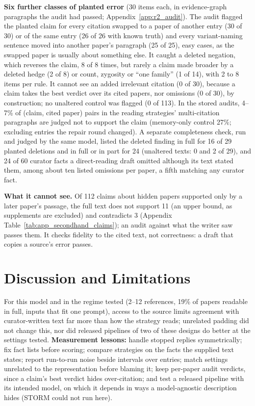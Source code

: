 \documentclass{article} %
\begin{document}
\textbf{Six further classes of planted error} (30 items each, in evidence-graph paragraphs the audit had passed; Appendix~\ref{app:r2_audit}). The audit flagged the planted claim for every citation swapped to a paper of another entry (30 of 30) or of the same entry (26 of 26 with known truth) and every variant-naming sentence moved into another paper's paragraph (25 of 25), easy cases, as the swapped paper is usually about something else. It caught a deleted negation, which reverses the claim, 8 of 8 times, but rarely a claim made broader by a deleted hedge (2 of 8) or count, zygosity or ``one family'' (1 of 14), with 2 to 8 items per rule. It cannot see an added irrelevant citation (0 of 30), because a claim takes the best verdict over its cited papers, nor omissions (0 of 30), by construction; no unaltered control was flagged (0 of 113). In the stored audits, 4--7\% of (claim, cited paper) pairs in the reading strategies' multi-citation paragraphs are judged not to support the claim (memory-only control 27\%; excluding entries the repair round changed). A separate completeness check, run and judged by the same model, listed the deleted finding in full for 16 of 29 planted deletions and in full or in part for 24 (unaltered texts: 0 and 2 of 29), and 24 of 60 curator facts a direct-reading draft omitted although its text stated them, among about ten listed omissions per paper, a fifth matching any curator fact.

\textbf{What it cannot see.} Of 112 claims about hidden papers supported only by a later paper's passage, the full text does not support 11 (an upper bound, as supplements are excluded) and contradicts 3 (Appendix Table~\ref{tab:app_secondhand_claims}); an audit against what the writer saw passes them. It checks fidelity to the cited text, not correctness: a draft that copies a source's error passes.

\section{Discussion and Limitations}
\label{sec:discussion}
For this model and in the regime tested (2--12 references, 19\% of papers readable in full, inputs that fit one prompt), access to the source limits agreement with curator-written text far more than how the strategy reads; unrelated padding did not change this, nor did released pipelines of two of these designs do better at the settings tested. \textbf{Measurement lessons:} handle stopped replies symmetrically; fix fact lists before scoring; compare strategies on the facts the supplied text states; report run-to-run noise beside intervals over entries; match settings unrelated to the representation before blaming it; keep per-paper audit verdicts, since a claim's best verdict hides over-citation; and test a released pipeline with its intended model, on which it depends in ways a model-agnostic description hides (STORM could not run here).
\end{document}
